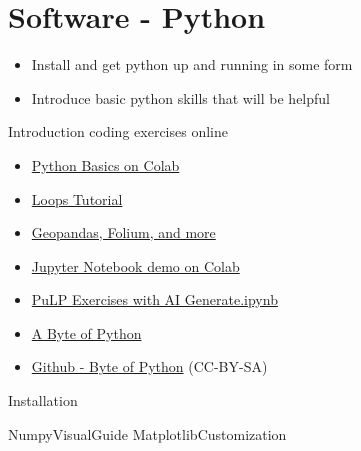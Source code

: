 \chapter{Software - Python}

\begin{outcome}
\begin{itemize}
\item Install and get python up and running in some form
\item Introduce basic python skills that will be helpful
\end{itemize}
\end{outcome}

\begin{resource}
Introduction coding exercises online
\begin{itemize}
\item \href{https://colab.research.google.com/drive/1dqQSVfNMchIbk0k4OByve0muZeyvih6j?usp=sharing}{Python Basics on Colab}
\item \href{https://colab.research.google.com/drive/1Ma8tQw6LU0NCF3jY62v7FAmXJOxbSph_?usp=sharing}{Loops Tutorial}
\item \href{https://colab.research.google.com/drive/1b5Cvfl1sGYb0YBUE75uTLLX4aO8mSXcQ?usp=sharing}{Geopandas, Folium, and more}
\item \href{https://colab.research.google.com/drive/1nn43ay5zCq9KVPlpUeuyFPex2Q73FvxI?usp=sharing}{Jupyter Notebook demo on Colab}
\item \href{https://colab.research.google.com/drive/1paYp36cHf_EvZcMYfD-dN1TtJ_abkpM2?usp=sharing}{PuLP Exercises with AI Generate.ipynb}
\end{itemize}

\begin{itemize}
\item\href{https://open.umn.edu/opentextbooks/textbooks/a-byte-of-python}{A Byte of Python}
\item\href{https://github.com/swaroopch/byte-of-python}{Github - Byte of Python} (CC-BY-SA)
\end{itemize}
\end{resource}

{Installation} 




{NumpyVisualGuide} %
{MatplotlibCustomization} %

